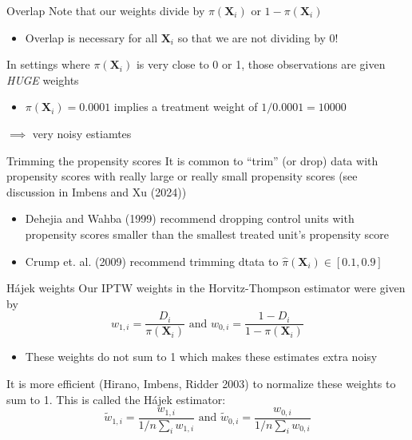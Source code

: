 \documentclass[aspectratio=169,t,11pt,table]{beamer}
\begin{document}
\begin{frame}{Overlap}
  Note that our weights divide by $\pi(\bm{X}_i)$ or $1 - \pi(\bm{X}_i)$
  \begin{itemize}
    \item Overlap is necessary for all $\bm{X}_i$ so that we are not dividing by 0!
  \end{itemize}

  \pause
  \bigskip
  In settings where $\pi(\bm{X}_i)$ is very close to 0 or 1, those observations are given \emph{HUGE} weights
  \begin{itemize}
    \item $\pi(\bm{X}_i) = 0.0001$ implies a treatment weight of $1 / 0.0001 = 10000$
  \end{itemize}
  \pause
  $\implies$ very noisy estiamtes
\end{frame}

\begin{frame}{Trimming the propensity scores}
  It is common to ``trim'' (or drop) data with propensity scores with really large or really small propensity scores (see discussion in Imbens and Xu (2024))
  \begin{itemize}
    \item Dehejia and Wahba (1999) recommend dropping control units with propensity scores smaller than the smallest treated unit's propensity score
    
    \item Crump et. al. (2009) recommend trimming dtata to $\hat{\pi}(\bm{X}_i) \in [0.1, 0.9]$ 
  \end{itemize}
\end{frame}

\begin{frame}{Hájek weights}
  Our IPTW weights in the Horvitz-Thompson estimator were given by 
  $$
    w_{1,i} = \frac{D_i}{\pi(\bm{X}_i)} \text{ and } w_{0,i} = \frac{1 - D_i}{1 - \pi(\bm{X}_i)}
  $$
  \begin{itemize}
    \item These weights do not sum to 1 which makes these estimates extra noisy
  \end{itemize}

  \bigskip
  \pause
  It is more efficient (Hirano, Imbens, Ridder 2003) to normalize these weights to sum to 1. This is called the Hájek estimator:
  $$
    \tilde{w}_{1,i} = \frac{w_{1,i}}{1/n \sum_i w_{1,i}} \text{ and } \tilde{w}_{0,i} = \frac{w_{0,i}}{1/n \sum_i w_{0,i}} 
  $$
\end{frame}
\end{document}
